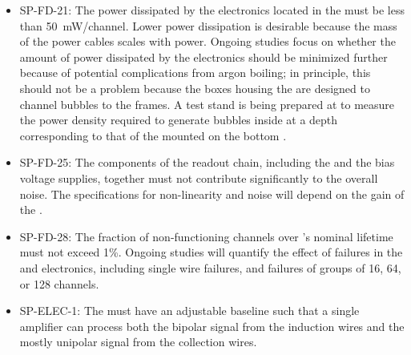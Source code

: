 \begin{itemize}
\item SP-FD-21:   The power dissipated by the electronics located in the  must
be less than \SI{50}{mW/channel}. Lower power dissipation is desirable because 
the mass of the power cables scales with  power. 
 Ongoing studies 
focus on whether the amount of power dissipated by the electronics 
should be minimized further 
 because of potential complications from 
argon boiling; in principle, this should not be a problem because the 
 boxes housing the  are designed to channel 
bubbles to the  frames. A test stand is being prepared
at  to measure the power density required to generate
bubbles inside  at a depth corresponding
to that of the  mounted on the bottom .

\item SP-FD-25: 
The components of the readout chain, including the 
and the bias voltage supplies, together must not contribute significantly to
the overall noise. %
The  specifications for non-linearity and noise will depend on the gain of the .




\item SP-FD-28: The fraction of non-functioning channels over %
's nominal  \dunelifetime
lifetime %
must not exceed 1\%. Ongoing studies %
will quantify the effect of failures
in the  and electronics, including
single wire failures, and failures of groups of
\num{16}, \num{64}, or \num{128} channels.

\item SP-ELEC-1: The  must have an adjustable baseline such that a single
amplifier can process both the
bipolar signal from the induction wires and the mostly unipolar signal 
from the collection wires. %


\end{itemize}
